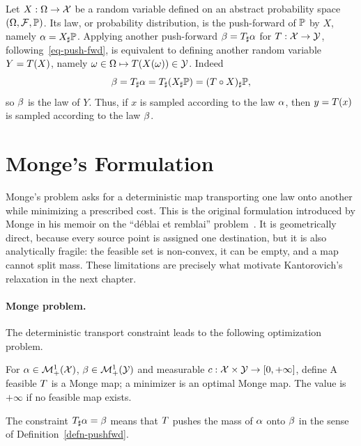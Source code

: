 \begin{rem}
Let $X:\Omega\to\mathcal{X}$ be a random variable defined on an abstract probability
space $(\Omega,\mathcal{F},\mathbb{P})$. Its law, or probability distribution, is the
push-forward of $\mathbb{P}$ by $X$, namely $\alpha=X_\sharp\mathbb{P}$.
%
Applying another push-forward $\beta = T_\sharp\alpha$ for $T : \mathcal{X} \rightarrow \mathcal{Y}$, following~\eqref{eq-push-fwd}, is equivalent to defining another random variable $Y=T(X)$, namely $\omega \in \Omega \mapsto T(X(\omega)) \in \mathcal{Y}$. Indeed
\[
	\beta=T_\sharp\alpha=T_\sharp(X_\sharp\mathbb{P})=(T\circ X)_\sharp\mathbb{P},
\]
so $\beta$ is the law of $Y$.
%
Thus, if $x$ is sampled according to the law $\alpha$, then $y=T(x)$ is sampled according to the law $\beta$.
\end{rem}

\section{Monge's Formulation}
\label{sec-monge-formulation}
\label{sec-continuous-monge}

Monge's problem asks for a deterministic map transporting one law onto another while minimizing a prescribed cost. This is the original formulation introduced by Monge in his memoir on the ``d\'eblai et remblai'' problem~\cite{Monge1781}. It is geometrically direct, because every source point is assigned one destination, but it is also analytically fragile: the feasible set is non-convex, it can be empty, and a map cannot split mass. These limitations are precisely what motivate Kantorovich's relaxation in the next chapter.

\paragraph{Monge problem.}

The deterministic transport constraint leads to the following optimization problem.
\begin{defn}\label{def-monge-problem}
	For $\alpha\in\mathcal{M}_+^1(\mathcal{X})$, $\beta\in\mathcal{M}_+^1(\mathcal{Y})$ and measurable $c:\mathcal{X}\times\mathcal{Y}\to[0,+\infty]$, define
	A feasible $T$ is a Monge map; a minimizer is an optimal Monge map. The value is $+\infty$ if no feasible map exists.
\end{defn}
The constraint $T_\sharp\alpha=\beta$ means that $T$ pushes the mass of $\alpha$ onto $\beta$ in the sense of Definition~\ref{defn-pushfwd}.

